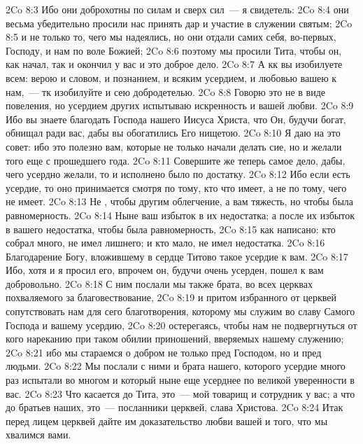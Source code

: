\vs 2Co 8:3 Ибо они доброхотны по силам и сверх сил~--- я свидетель:
\vs 2Co 8:4 они весьма убедительно просили нас принять дар и участие  в служении святым;
\vs 2Co 8:5 и не только то, чего мы надеялись, но они отдали самих себя, во-первых, Господу,  и нам по воле Божией;
\vs 2Co 8:6 поэтому мы просили Тита, чтобы он, как начал, так и окончил у вас и это доброе дело.
\rsbpar\vs 2Co 8:7 А кк вы изобилуете всем: верою и словом, и познанием, и всяким усердием, и любовью вашею к нам,~--- тк изобилуйте и сею добродетелью.
\vs 2Co 8:8 Говорю это не в виде повеления, но усердием других испытываю искренность и вашей любви.
\vs 2Co 8:9 Ибо вы знаете благодать Господа нашего Иисуса Христа, что Он, будучи богат, обнищал ради вас, дабы вы обогатились Его нищетою.
\vs 2Co 8:10 Я даю на это совет: ибо это полезно вам, которые не только начали делать сие, но и желали того еще с прошедшего года.
\vs 2Co 8:11 Совершите же теперь самое дело, дабы, чего усердно желали, то и исполнено было по достатку.
\vs 2Co 8:12 Ибо если есть усердие, то оно принимается смотря по тому, кто что имеет, а не по тому, чего не имеет.
\vs 2Co 8:13 Не , чтобы другим  облегчение, а вам тяжесть, но чтобы была равномерность.
\vs 2Co 8:14 Ныне ваш избыток в  их недостатка; а после их избыток в  вашего недостатка, чтобы была равномерность,
\vs 2Co 8:15 как написано: кто собрал много, не имел лишнего; и кто мало, не имел недостатка.
\rsbpar\vs 2Co 8:16 Благодарение Богу, вложившему в сердце Титово такое усердие к вам.
\vs 2Co 8:17 Ибо, хотя и я просил его, впрочем он, будучи очень усерден, пошел к вам добровольно.
\vs 2Co 8:18 С ним послали мы также брата, во всех церквах похваляемого за благовествование,
\vs 2Co 8:19 и притом избранного от церквей сопутствовать нам для сего благотворения, которому мы служим во славу Самого Господа и  вашему усердию,
\vs 2Co 8:20 остерегаясь, чтобы нам не подвергнуться от кого нареканию при таком обилии приношений, вверяемых нашему служению;
\vs 2Co 8:21 ибо мы стараемся о добром не только пред Господом, но и пред людьми.
\vs 2Co 8:22 Мы послали с ними и брата нашего, которого усердие много раз испытали во многом и который ныне еще усерднее по великой уверенности в вас.
\vs 2Co 8:23 Что касается до Тита, это~--- мой товарищ и сотрудник у вас; а что до братьев наших, это~--- посланники церквей, слава Христова.
\vs 2Co 8:24 Итак перед лицем церквей дайте им доказательство любви вашей и того, что мы  хвалимся вами.
